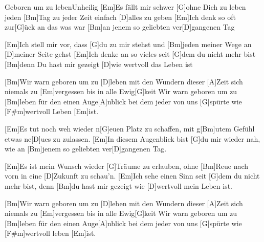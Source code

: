 \documentclass[../main.tex]{subfiles}
\begin{document}
\begin{song}{Geboren um zu leben}{Unheilig}{}
[Em]Es fällt mir schwer [G]ohne Dich zu leben
jeden [Bm]Tag zu jeder Zeit einfach [D]alles zu geben
[Em]Ich denk so oft zur[G]{ü}ck an das was war
[Bm]an jenem so geliebten ver[D]gangenen Tag

[Em]Ich stell mir vor, dass [G]du zu mir stehst
und [Bm]jeden meiner Wege an [D]meiner Seite gehst
[Em]Ich denke an so vieles seit [G]dem du nicht mehr bist
[Bm]denn Du hast mir gezeigt [D]wie wertvoll das Leben ist

[Bm]Wir warn geboren um zu [D]leben  mit den Wundern dieser [A]Zeit
sich niemals zu [Em]vergessen bis in alle Ewig[G]keit
Wir warn geboren um zu [Bm]leben für den einen Auge[A]nblick
bei dem jeder von uns [G]spürte wie [F#m]wertvoll Leben [Em]ist.

[Em]Es tut noch weh wieder n[G]euen Platz zu schaffen,
mit g[Bm]utem Gefühl etwas ne[D]ues zu zulassen.
[Em]In diesem Augenblick bist [G]du mir wieder nah,
wie an [Bm]jenem so geliebten ver[D]gangenen Tag.

[Em]Es ist mein Wunsch wieder [G]Träume zu erlauben,
ohne [Bm]Reue nach vorn in eine [D]Zukunft zu schau'n.
[Em]Ich sehe einen Sinn seit [G]dem du nicht mehr bist,
denn [Bm]du hast mir gezeigt wie [D]wertvoll mein Leben ist.

[Bm]Wir warn geboren um zu [D]leben  mit den Wundern dieser [A]Zeit
sich niemals zu [Em]vergessen bis in alle Ewig[G]keit
Wir warn geboren um zu [Bm]leben für den einen Auge[A]nblick
bei dem jeder von uns [G]spürte wie [F#m]wertvoll leben [Em]ist.
\end{song}
\end{document}
